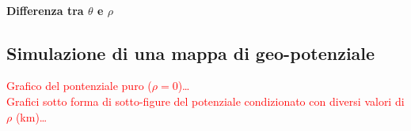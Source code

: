 \paragraph[Differenza tra $\theta$ e $\rho$]{Differenza tra $\theta$ e $\rho$}

\subsection[Simulazione di una mappa di geo-potenziale]{Simulazione di una mappa di geo-potenziale}
\textcolor{red}{Grafico del pontenziale puro ($\rho=0$)\dots}\\
\textcolor{red}{Grafici sotto forma di sotto-figure del potenziale condizionato con diversi valori di $\rho$ (\si{\kilo\meter})\dots}